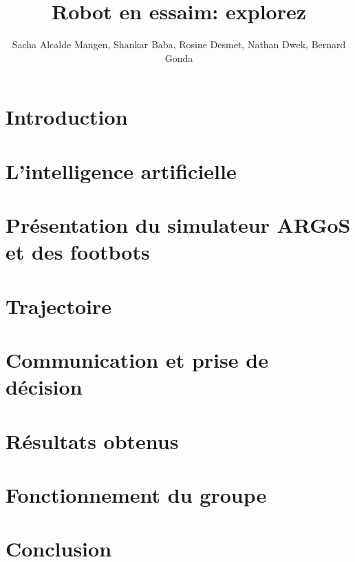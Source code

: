\documentclass[a4paper,11pt]{report}
\title{Robot en essaim: explorez}
\author{Sacha Alcalde Mangen, Shankar Baba, Rosine Desmet, Nathan Dwek, Bernard Gonda}
\begin{document}


\begin{abstract}

\end{abstract}

\begin{abstract}

\end{abstract}

\tableofcontents

\chapter{Introduction}


\chapter{L'intelligence artificielle\label{chap:AI}}



\chapter[ARGoS et les footbots]{Présentation du simulateur ARGoS et des footbots\label{chap:argosFootbot}}


\chapter{Trajectoire}


\chapter{Communication et prise de décision}


\chapter{Résultats obtenus}


\chapter{Fonctionnement du groupe}


\chapter{Conclusion}


\listofalgorithms


\lstlistoflistings


\listoffigures


\nocite{*}



\end{document}
